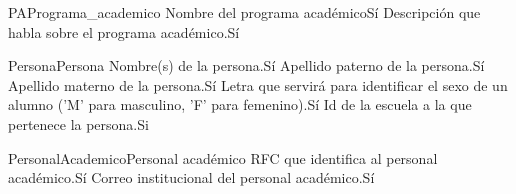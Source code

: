 \begin{cdtEntidad}{PA}{Programa\_academico}
	{Nombre del programa académico}{Sí}
	{Descripción que habla sobre el programa académico.}{Sí}
\end{cdtEntidad}
\begin{cdtEntidad}{Persona}{Persona}
	{Nombre(s) de la persona.}{Sí}
	{Apellido paterno de la persona.}{Sí}
	{Apellido materno de la persona.}{Sí}
	{Letra que servirá para identificar el sexo de un alumno ('M' para masculino, 'F' para femenino).}{Sí}
	{Id de la escuela a la que pertenece la persona.}{Si}
\end{cdtEntidad}
\begin{cdtEntidad}{PersonalAcademico}{Personal académico}
	{RFC que identifica al personal académico.}{Sí}
	{Correo institucional del personal académico.}{Sí}
\end{cdtEntidad}
